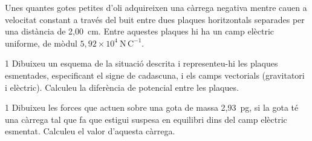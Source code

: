 Unes quantes gotes petites d'oli adquireixen una càrrega negativa mentre cauen a velocitat constant a través del buit entre dues plaques horitzontals separades per una distància de 2,00~cm. Entre aquestes plaques hi ha un camp elèctric uniforme, de mòdul $5,92\times 10^{4}\ \mathrm{N\,C^{-1}}$.

\begin{apartat}{1}
Dibuixeu un esquema de la situació descrita i representeu-hi les plaques esmentades, especificant el signe de cadascuna, i els camps vectorials (gravitatori i elèctric). Calculeu la diferència de potencial entre les plaques.
\end{apartat}

\begin{apartat}{1}
Dibuixeu les forces que actuen sobre una gota de massa 2,93~pg, si la gota té una càrrega tal que fa que estigui suspesa en equilibri dins del camp elèctric esmentat. Calculeu el valor d'aquesta càrrega.
\end{apartat}

